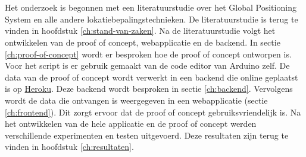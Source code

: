 
\chapter{}
\label{ch:methodologie}

Het onderzoek is begonnen met een literatuurstudie over het Global Positioning System en alle andere lokatiebepalingstechnieken. De literatuurstudie is terug te vinden in hoofdstuk \ref{ch:stand-van-zaken}.
\newline
\newline
Na de literatuurstudie volgt het ontwikkelen van de proof of concept, webapplicatie en de backend. In sectie \ref{ch:proof-of-concept} wordt er besproken hoe de proof of concept ontworpen is. Voor het script is er gebruik gemaakt van de code editor van Arduino zelf. 
\newline
\newline
De data van de proof of concept wordt verwerkt in een backend die online geplaatst is op \href{www.heroku.com}{Heroku}. Deze backend wordt besproken in sectie \ref{ch:backend}.
\newline
\newline
Vervolgens wordt de data die ontvangen is weergegeven in een webapplicatie (sectie \ref{ch:frontend}). Dit zorgt ervoor dat de proof of concept gebruiksvriendelijk is. 
\newline
\newline
Na het ontwikkelen van de hele applicatie en de proof of concept werden verschillende experimenten en testen uitgevoerd. Deze resultaten zijn terug te vinden in hoofdstuk \ref{ch:resultaten}.
